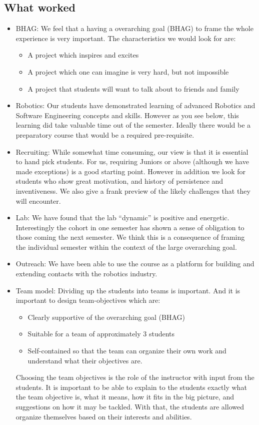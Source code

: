 \subsection{What worked}
\begin{itemize}
\item BHAG: We feel that a having a overarching goal (BHAG) to frame the whole experience is very important. The characteristics we would look for are:
\begin{itemize}
\item A project which inspires and excites
\item A project which one can imagine is very hard, but not impossible
\item A project that students will want to talk about to friends and family
\end{itemize}

\item Robotics: Our students have demonstrated learning of advanced Robotics and Software Engineering concepts and skills. However as you see below, this learning did take valuable time out of the semester. Ideally there would be a preparatory course that would be a required pre-requisite.
\item Recruiting: While somewhat time consuming, our view is that it is essential to hand pick students. For us, requiring Juniors or above (although we have made exceptions) is a good starting point. However in addition we look for students who show great motivation, and history of persistence and inventiveness. We also give a frank preview of the likely challenges that they will encounter.
\item Lab: We have found that the lab “dynamic” is positive and energetic. Interestingly the cohort in one semester has shown a sense of obligation to those coming the next semester. We think this is a consequence of framing the individual semester within the context of the large overarching goal.
\item Outreach: We have been able to use the course as a platform for building and extending contacts with the robotics industry.
\item Team model: Dividing up the students into teams is important. And it is important to design team-objectives which are:
  \begin{itemize}
  \item Clearly supportive of the overarching goal (BHAG)
  \item Suitable for a team of approximately 3 students
  \item Self-contained so that the team can organize their own work and understand what their objectives are.
  \end{itemize}
Choosing the team objectives is the role of the instructor with input from the students. It is important to be able to explain to the students exactly what the team objective is, what it means, how it fits in the big picture, and suggestions on how it may be tackled. With that, the students are allowed organize themselves based on their interests and abilities.
\end{itemize}

